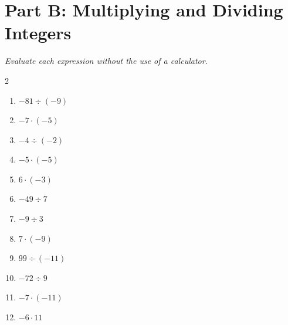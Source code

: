 \documentclass[11pt]{article}
\begin{document}
\section*{Part B: Multiplying and Dividing Integers}
\noindent\textit{Evaluate each expression without the use of a calculator.}
\begin{multicols}{2}
\begin{enumerate}
  \item $-81 \div (-9)$
  \vspace{1.0cm}
  \item $-7 \cdot (-5)$
  \vspace{1.0cm}
  \item $-4 \div (-2)$
  \vspace{1.0cm}
  \item $-5 \cdot (-5)$
  \vspace{1.0cm}
  \item $6 \cdot (-3)$
  \vspace{1.0cm}
  \item $-49 \div 7$
  \vspace{1.0cm}
  \item $-9 \div 3$
  \vspace{1.0cm}
  \item $7 \cdot (-9)$
  \vspace{1.0cm}
  \item $99 \div (-11)$
  \vspace{1.0cm}
  \item $-72 \div 9$
  \vspace{1.0cm}
  \item $-7 \cdot (-11)$
  \vspace{1.0cm}
  \item $-6 \cdot 11$
  \vspace{1.0cm}
\end{enumerate}
\end{multicols}
\end{document}
